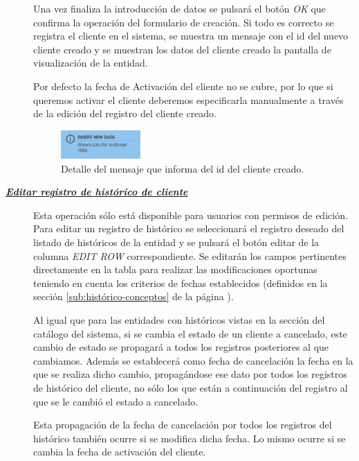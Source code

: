 \begin{description}
Una vez finaliza la introducción de datos se pulsará el botón \emph{OK} que confirma la operación del formulario de creación. Si todo es correcto se registra el cliente en el sistema, se muestra un mensaje con el id del nuevo cliente creado y se muestran los datos del cliente creado la pantalla de visualización de la entidad.

Por defecto la fecha de Activación del cliente no se cubre, por lo que si queremos activar el cliente deberemos especificarla manualmente a través de la edición del registro del cliente creado.


\begin{figure}[H]
  \centering
  \includegraphics[width=0.3\textwidth]{imaxes/mensaje-id-cliente.png}
  \caption{Detalle del mensaje que informa del id del cliente creado.}
  \label{fig:mensaje-id-cliente}
\end{figure}


\item[\underline{\textsl{\textbf{Editar registro de histórico de cliente}}}] Esta operación sólo está disponible para usuarios con permisos de edición.
Para editar un registro de histórico se seleccionará el registro deseado del listado de históricos de la entidad y se pulsará el botón editar de la columna \textit{EDIT ROW} correspondiente. Se editarán los campos pertinentes directamente en la tabla para realizar las modificaciones oportunas teniendo en cuenta los criterios de fechas establecidos (definidos en la sección \ref{sub:histórico-conceptos} de la página \pageref{sub:histórico-conceptos}).

Al igual que para las entidades con históricos vistas en la sección del catálogo del sistema, si se cambia el estado de un cliente a cancelado, este cambio de estado se propagará a todos los registros posteriores al que cambiamos. Además se establecerá como fecha de cancelación la fecha en la que se realiza dicho cambio, propagándose ese dato por todos los registros de histórico del cliente, no sólo los que están a continuación del registro al que se le cambió el estado a cancelado.

Esta propagación de la fecha de cancelación por todos los registros del histórico  también ocurre si se modifica dicha fecha. Lo mismo ocurre si se cambia la fecha de activación del cliente.


\end{description}
